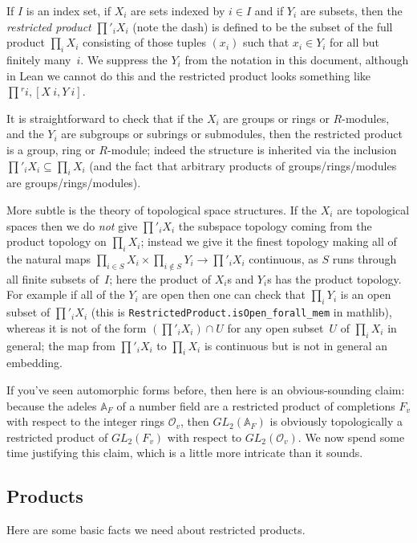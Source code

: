 If $I$ is an index set, if $X_i$ are sets indexed by $i\in I$ and if $Y_i$
are subsets, then the \emph{restricted product} $\prod'_iX_i$ (note the dash) is defined
to be the subset of the full product $\prod_i X_i$ consisting of those
tuples $(x_i)$ such that $x_i\in Y_i$ for all but finitely many~$i$. We suppress
the $Y_i$ from the notation in this document, although in Lean we cannot do this and
the restricted product looks something like $\prod{}^{r} i,[X\ i, Y\ i]$.

It is straightforward to check that if the $X_i$ are groups or rings or $R$-modules,
and the $Y_i$ are subgroups or subrings or submodules, then the restricted product
is a group, ring or $R$-module; indeed the structure is inherited via the
inclusion $\prod'_iX_i\subseteq\prod_iX_i$ (and the fact that arbitrary products
of groups/rings/modules are groups/rings/modules).

More subtle is the theory of topological space structures. If the $X_i$
are topological spaces then we do \emph{not} give $\prod'_iX_i$ the subspace
topology coming from the product topology on $\prod_iX_i$; instead we give
it the finest topology making all of the
natural maps $\prod_{i\in S}X_i\times\prod_{i\notin S}Y_i\to \prod'_iX_i$ continuous,
as $S$ runs through all finite subsets of~$I$; here the product of $X_i$s and $Y_i$s
has the product topology. For example if all of the $Y_i$ are open
then one can check that $\prod_iY_i$ is an open subset of
$\prod'_iX_i$ (this is {\tt RestrictedProduct.isOpen\_forall\_mem} in mathlib),
whereas it is not of the form $\left(\prod'_iX_i\right)\cap U$ for any open subset~$U$
of $\prod_iX_i$ in general; the map from $\prod'_i X_i$ to $\prod_i X_i$ is continuous
but is not in general an embedding.

If you've seen automorphic forms before, then here is an obvious-sounding claim:
because the adeles $\mathbb{A}_F$ of a number field are a restricted product of
completions $F_v$ with respect to the integer rings $\mathcal{O}_v$, then
$GL_2(\mathbb{A}_F)$ is obviously topologically a restricted product of
$GL_2(F_v)$ with respect to $GL_2(\mathcal{O}_v)$. We now spend some time justifying
this claim, which is a little more intricate than it sounds.

\subsection{Products}

Here are some basic facts we need about restricted products.

